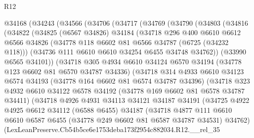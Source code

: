 \begin{lexlean}{R12}
\begin{coremodule}
  @34168
    (@34243
      (@34566
        (@34706
          (@34717
            (@34769
              (@34790
                (@34803
                  (@34816
                    (@34822
                      (@34825
                        (@6567 @34826)
                        @34184
                        (@34718
                          @296
                          @400
                          @6610
                          @6612
                          @6566
                          @34826
                          (@34778 @118 @6602 @81 @6566 @34787 (@6725 (@34232 @118)))
                          (@34736 @111 @6610 @6610 @34254 @6455 @34748 @34762))
                        (@33990 @6565 @34101))
                      (@34718
                        @305
                        @4934
                        @6610
                        @34124
                        @6570
                        @34194
                        (@34778 @123 @6602 @81 @6570 @34787 @34336)
                        (@34718
                          @314
                          @4933
                          @6610
                          @34123
                          @6574
                          @34193
                          (@34778 @164 @6602 @81 @6574 @34787 @34396)
                          (@34718
                            @323
                            @4932
                            @6610
                            @34122
                            @6578
                            @34192
                            (@34778 @169 @6602 @81 @6578 @34787 @34411)
                            (@34718
                              @4926
                              @4931
                              @34113
                              @34121
                              @34187
                              @34191
                              (@34725
                                @4922
                                @4925
                                @6612
                                @34112
                                (@6588 @6455)
                                @34187
                                (@34718
                                  @4877
                                  @111
                                  @6610
                                  @6610
                                  @6587
                                  @6455
                                  (@34778 @249 @6602 @81 @6587 @34787 @34531)
                                  @34762)
                                (LexLeanPreserve.Cb54b5ce6e1753deba173f2954c882034.R12.__rel_35

\end{coremodule}
\end{lexlean}
